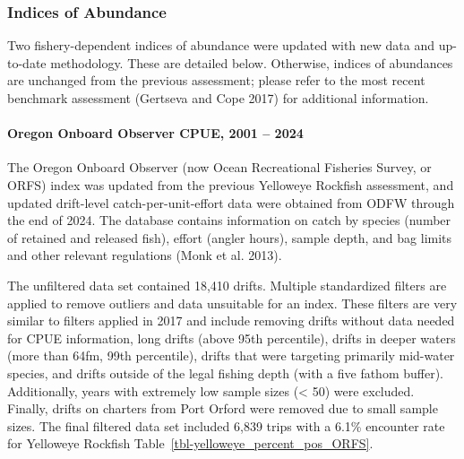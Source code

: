 \documentclass[
]{scrartcl}
\let\oldparagraph\paragraph
\renewcommand{\paragraph}[1]{\oldparagraph{#1}\mbox{}}
\begin{document}
\subsubsection{Indices of Abundance}\label{indices-of-abundance}

Two fishery-dependent indices of abundance were updated with new data
and up-to-date methodology. These are detailed below. Otherwise, indices
of abundances are unchanged from the previous assessment; please refer
to the most recent benchmark assessment (Gertseva and Cope 2017) for
additional information.

\paragraph{Oregon Onboard Observer CPUE, 2001 --
2024}\label{oregon-onboard-observer-cpue-2001-2024}

The Oregon Onboard Observer (now Ocean Recreational Fisheries Survey, or
ORFS) index was updated from the previous Yelloweye Rockfish assessment,
and updated drift-level catch-per-unit-effort data were obtained from
ODFW through the end of 2024. The database contains information on catch
by species (number of retained and released fish), effort (angler
hours), sample depth, and bag limits and other relevant regulations
(Monk et al. 2013).

The unfiltered data set contained 18,410 drifts. Multiple standardized
filters are applied to remove outliers and data unsuitable for an index.
These filters are very similar to filters applied in 2017 and include
removing drifts without data needed for CPUE information, long drifts
(above 95th percentile), drifts in deeper waters (more than 64fm, 99th
percentile), drifts that were targeting primarily mid-water species, and
drifts outside of the legal fishing depth (with a five fathom buffer).
Additionally, years with extremely low sample sizes (\textless{} 50)
were excluded. Finally, drifts on charters from Port Orford were removed
due to small sample sizes. The final filtered data set included 6,839
trips with a 6.1\% encounter rate for Yelloweye Rockfish
Table~\ref{tbl-yelloweye_percent_pos_ORFS}.
\end{document}
